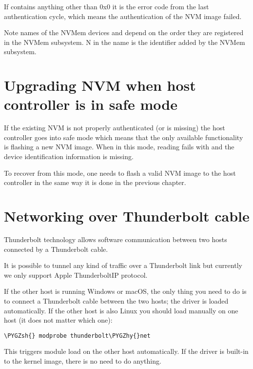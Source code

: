 \documentclass[a4paper,8pt,english]{sphinxmanual}
\def\PYGZsh{\char`\#}
\def\PYGZhy{\char`\-}
\begin{document}
If  contains anything other than 0x0 it is the error
code from the last authentication cycle, which means the authentication
of the NVM image failed.

Note names of the NVMem devices  and 
depend on the order they are registered in the NVMem subsystem. N in
the name is the identifier added by the NVMem subsystem.


\section{Upgrading NVM when host controller is in safe mode}
\label{admin-guide/thunderbolt:upgrading-nvm-when-host-controller-is-in-safe-mode}
If the existing NVM is not properly authenticated (or is missing) the
host controller goes into safe mode which means that the only available
functionality is flashing a new NVM image. When in this mode, reading
 fails with  and the device identification
information is missing.

To recover from this mode, one needs to flash a valid NVM image to the
host controller in the same way it is done in the previous chapter.


\section{Networking over Thunderbolt cable}
\label{admin-guide/thunderbolt:networking-over-thunderbolt-cable}
Thunderbolt technology allows software communication between two hosts
connected by a Thunderbolt cable.

It is possible to tunnel any kind of traffic over a Thunderbolt link but
currently we only support Apple ThunderboltIP protocol.

If the other host is running Windows or macOS, the only thing you need to
do is to connect a Thunderbolt cable between the two hosts; the
 driver is loaded automatically. If the other host is
also Linux you should load  manually on one host (it
does not matter which one):

\begin{Verbatim}[commandchars=\\\{\}]
\PYGZsh{} modprobe thunderbolt\PYGZhy{}net
\end{Verbatim}

This triggers module load on the other host automatically. If the driver
is built-in to the kernel image, there is no need to do anything.
\end{document}
